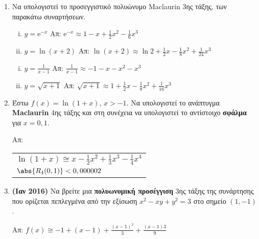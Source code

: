 \documentclass[a4paper,table]{report}
\newcommand{\twocolumnsidesss}[2]{\begin{minipage}[t]{0.52\linewidth}\raggedright
        #1
        \end{minipage}\hfill\begin{minipage}[t]{0.47\linewidth}\raggedright
        #2
    \end{minipage}
}
\begin{document}
\begin{enumerate}

  \item Να υπολογιστεί το προσεγγιστικό πολυώνυμο Maclaurin 3ης τάξης, των 
    παρακάτω συναρτήσεων.

    \twocolumnsidesss{
      \begin{enumerate}[i)]
        \item $ y= \mathrm{e}^{-x} $ 
          \hfill Απ: $ \mathrm{e}^{-x} \approx 1-x+ \frac{1}{2} x^{2} - \frac{1}{6} x^{3} $ 
        \item $ y= \ln{(x+2)} $ \;
          \hfill Απ: $ \ln{(x+2)} \approx \ln{2} + \frac{1}{2} x - \frac{1}{8} x^{2} +
          \frac{1}{24} x^{3} $ 
      \end{enumerate}
    }{
      \begin{enumerate}[i),start=3]
        \item $ y= \frac{1}{x-1} $ \hfill Απ: $ \frac{1}{x-1} \approx -1 -x -x^{2} - x^{3} $ 
        \item $ y= \sqrt{x+1} $ \hfill Απ: $ \sqrt{x+1} \approx 1 + \frac{1}{2} x -
          \frac{1}{8} x^{2} + \frac{1}{16} x^{3} $ 
      \end{enumerate}
    }

    \item Έστω $ f(x) = \ln{(1+x)} $, $ x>-1 $. Να υπολογιστεί το ανάπτυγμα
      \textbf{Maclaurin} 4ης τάξης και στη συνέχεια να υπολογιστεί το αντίστοιχο 
      \textbf{σφάλμα} για $ x = 0,1 $.

      \hfill Απ: \begin{tabular}{l}
        $ \ln(1+x) \cong x - \frac{1}{2} x^{2} + \frac{1}{3}x^{3} - 
        \frac{1}{4} x^{4} $ \\ 
        $ \abs{R_{4}(0,1)} < 0,000002$	
      \end{tabular}

  \item{\bfseries (Ιαν 2016)} Να βρείτε μια \textbf{πολυωνυμική προσέγγιση} 3ης τάξης 
    της συνάρτησης που ορίζεται πεπλεγμένα από την εξίσωση 
    $ x^{2} - xy + y^{2} = 3$ στο σημείο $ (1,-1) $.

    \hfill Απ: $f(x) \cong -1 + (x-1) + \frac{(x-1)^{2}}{3} +
    \frac{(x-1){3}}{9}$


\end{enumerate}
\end{document}
